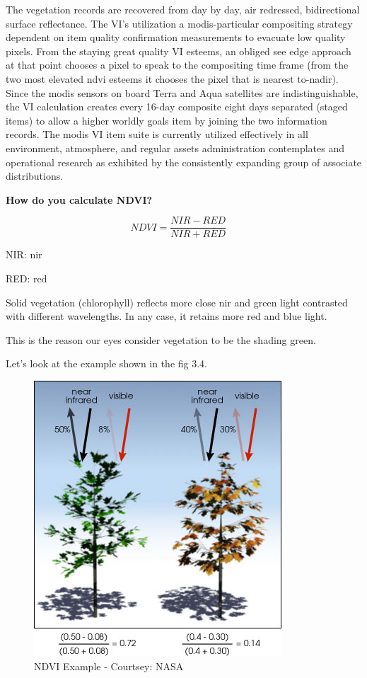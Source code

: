 The vegetation records are recovered from day by day, air redressed, bidirectional surface reflectance. The VI's utilization a \gls{modis}-particular compositing strategy dependent on item quality confirmation measurements to evacuate low quality pixels. From the staying great quality VI esteems, an obliged see edge approach at that point chooses a pixel to speak to the compositing time frame (from the two most elevated \gls{ndvi} esteems it chooses the pixel that is nearest to-nadir). Since the \gls{modis} sensors on board Terra and Aqua satellites are indistinguishable, the VI calculation creates every 16-day composite eight days separated (staged items) to allow a higher worldly goals item by joining the two information records. The \gls{modis} VI item suite is currently utilized effectively in all environment, atmosphere, and regular assets administration contemplates and operational research as exhibited by the consistently expanding group of associate distributions. \\

\centerline{\textbf{How do you calculate NDVI?  \cite{theGISGeography}}}

\textbf{\[ NDVI = \frac{NIR - RED}{NIR + RED} \ \ \ 
\ \ \]}

\centerline{NIR: \gls{nir}}
\centerline{RED: \gls{red}}

Solid vegetation (chlorophyll) reflects more close \gls{nir} and green light contrasted with different wavelengths. In any case, it retains more red and blue light. 

This is the reason our eyes consider vegetation to be the shading green.

Let's look at the example shown in the fig 3.4.

    \begin{figure}[H]
            \centering
            \includegraphics[width=0.5\linewidth]{figures/ch3/ndvi-example.png}
            \caption{\label{fig:ndvi_example} NDVI Example - Courtsey: NASA \cite{MODIS}}
    \end{figure}

